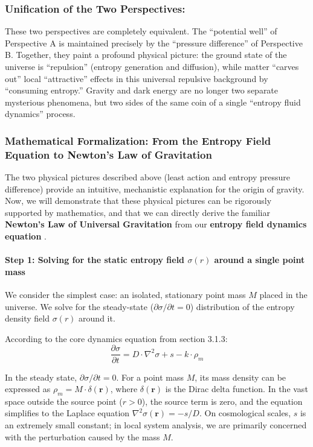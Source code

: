 \documentclass[11pt, a4paper]{article}
\begin{document}
\subsubsection*{Unification of the Two Perspectives:}
These two perspectives are completely equivalent. The ``potential well'' of Perspective A is maintained precisely by the ``pressure difference'' of Perspective B. Together, they paint a profound physical picture: the ground state of the universe is ``repulsion'' (entropy generation and diffusion), while matter ``carves out'' local ``attractive'' effects in this universal repulsive background by ``consuming entropy.'' Gravity and dark energy are no longer two separate mysterious phenomena, but two sides of the same coin of a single ``entropy fluid dynamics'' process.

\subsubsection{Mathematical Formalization: From the Entropy Field Equation to Newton's Law of Gravitation}

The two physical pictures described above (least action and entropy pressure difference) provide an intuitive, mechanistic explanation for the origin of gravity. Now, we will demonstrate that these physical pictures can be rigorously supported by mathematics, and that we can directly derive the familiar \textbf{Newton's Law of Universal Gravitation} from our \textbf{entropy field dynamics equation} \cite{Newton1687}.

\paragraph{Step 1: Solving for the static entropy field $\sigma(r)$ around a single point mass}

We consider the simplest case: an isolated, stationary point mass $M$ placed in the universe. We solve for the steady-state ($\partial\sigma/\partial t = 0$) distribution of the entropy density field $\sigma(r)$ around it.

According to the core dynamics equation from section 3.1.3:
\[
\frac{\partial\sigma}{\partial t} = D \cdot \nabla^2\sigma + s - k \cdot \rho_m
\]

In the steady state, $\partial\sigma/\partial t = 0$. For a point mass $M$, its mass density can be expressed as $\rho_m = M \cdot \delta(\mathbf{r})$, where $\delta(\mathbf{r})$ is the Dirac delta function. In the vast space outside the source point ($r > 0$), the source term is zero, and the equation simplifies to the Laplace equation $\nabla^2\sigma(\mathbf{r}) = -s/D$. On cosmological scales, $s$ is an extremely small constant; in local system analysis, we are primarily concerned with the perturbation caused by the mass $M$.
\end{document}
